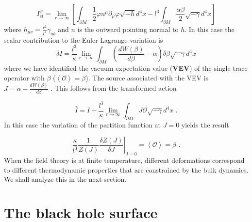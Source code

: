 \documentclass[11pt,epsf,letterpaper]{article}%
\begin{document}
\begin{equation}
I_{ct}^{\varphi}=\lim_{r\rightarrow\infty}\left[  \int_{\partial M}\frac{1}%
{2}\varphi n^{\mu}\partial_{\mu}\varphi\sqrt{-h}d^{4}x-l^{3}\int_{\partial
M}\frac{\alpha\beta}{2}\sqrt{-\gamma}d^{4}x\right]
\end{equation}
where $h_{\mu\nu}=\frac{r^{2}}{l^{2}}\gamma_{ab}$ and $n$ is the outward
pointing normal to $h$. In this case the scalar contribution to the
Euler-Lagrange variation is%
\begin{equation}
\delta I=\frac{l^{3}}{\kappa}\lim_{r\rightarrow\infty}\int_{\partial M}\left(
\frac{dW(\beta)}{d\beta}-\alpha\right)  \delta\beta\sqrt{-\gamma}d^{4}x
\end{equation}
where we have identified the vacuum expectation value (\textbf{VEV}) of the
single trace operator with $\beta$ ($\left\langle \mathcal{O}\right\rangle
=\beta$). The source associated with the VEV is $J=\alpha-\frac{dW(\beta
)}{d\beta}$ \cite{Marolf:2006nd}. This follows from the transformed action%

\begin{equation}
\bar{I}=I+\frac{l^{3}}{\kappa}\lim_{r\rightarrow\infty}\int_{\partial
M}J\mathcal{O}\sqrt{-\gamma}d^{4}x\text{ .}%
\end{equation}
In this case the variation of the partition function at $J=0$ yields the result%

\begin{equation}
\frac{\kappa}{l^{3}}\left.  \frac{1}{Z(J)}\frac{\delta Z(J)}{\delta
J}\right\vert _{J=0}=\left\langle \mathcal{O}\right\rangle =\beta\text{ .}%
\end{equation}
When the field theory is at finite temperature, different deformations
correspond to different thermodynamic properties that are constrained by the
bulk dynamics. We shall analyze this in the next section.

\section{The black hole surface}
\end{document}
